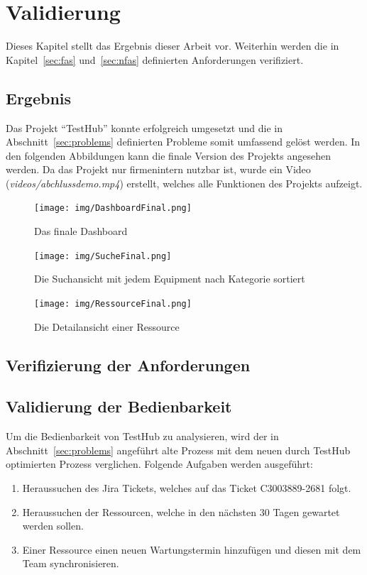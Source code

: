 \section{Validierung}
Dieses Kapitel stellt das Ergebnis dieser Arbeit vor. Weiterhin werden die in 
Kapitel~\ref{sec:fas} und~\ref{sec:nfas} definierten Anforderungen verifiziert.

\subsection{Ergebnis}
Das Projekt ``TestHub'' konnte erfolgreich umgesetzt und die in Abschnitt~\ref{sec:problems}
definierten Probleme somit umfassend gelöst werden. 
In den folgenden Abbildungen kann die finale Version des Projekts angesehen werden.
Da das Projekt nur firmenintern nutzbar ist, wurde ein Video 
(\textit{videos/abchlussdemo.mp4}) erstellt, welches alle Funktionen des 
Projekts aufzeigt. 

\begin{figure}[H]
    \texttt{[image: img/DashboardFinal.png]}
    \caption{Das finale Dashboard}
\end{figure}

\begin{figure}[H]
    \texttt{[image: img/SucheFinal.png]}
    \caption{Die Suchansicht mit jedem Equipment nach Kategorie sortiert}
\end{figure}

\begin{figure}[H]
    \texttt{[image: img/RessourceFinal.png]}
    \caption{Die Detailansicht einer Ressource}
\end{figure}

\subsection{Verifizierung der Anforderungen}



\subsection{Validierung der Bedienbarkeit}
Um die Bedienbarkeit von TestHub zu analysieren, wird der in Abschnitt~\ref{sec:problems}
angeführt alte Prozess mit dem neuen durch TestHub optimierten Prozess verglichen.
Folgende Aufgaben werden ausgeführt:

\begin{enumerate}
    \item Heraussuchen des Jira Tickets, welches auf das Ticket C3003889-2681 folgt.
    \item Heraussuchen der Ressourcen, welche in den nächsten 30 Tagen gewartet werden sollen.
    \item Einer Ressource einen neuen Wartungstermin hinzufügen und diesen mit dem Team synchronisieren.
\end{enumerate}

